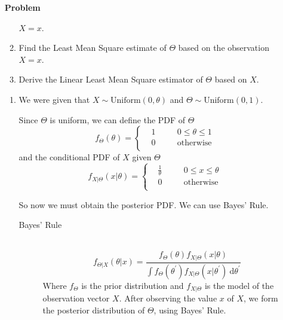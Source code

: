 \documentclass[12pt]{article}
\newenvironment{Ex}{\textbf{Problem}\vspace{.75em}\\}{}
\newcommand{\dd}[1]{\:\mathrm{d}{#1}}
\begin{document}
\begin{enumerate}
\begin{Ex}
\begin{enumerate}
      $X = x$.
    \item Find the Least Mean Square estimate of $\Theta$ based on the
      observation $X = x$.
    \item Derive the Linear Least Mean Square estimator of $\Theta$
      based on $X$.
    \end{enumerate}
    \begin{solution} \hfill
      \begin{enumerate}
      \item We were given that $X\sim\text{Uniform}(0,\theta)$ and
        $\Theta\sim\text{Uniform}(0,1)$.

        Since $\Theta$ is uniform, we can define the PDF of $\Theta$
        \begin{equation}
          \label{eq:4a-pdf-theta}
          f_\Theta(\theta)=\left\{
            \begin{aligned}
              & 1 &&\quad 0\le\theta\le1 \\
              & 0 &&\quad \text{otherwise} \\
            \end{aligned}\right.
        \end{equation}
        and the conditional PDF of $X$ given $\Theta$
        \begin{equation}
          \label{eq:4a-pdf-x-given-theta}
          f_{X|\Theta}(x|\theta)=\left\{
            \begin{aligned}
              & \frac{1}{\theta} &&\quad 0\le x \le\theta \\
              & 0 &&\quad \text{otherwise} \\
            \end{aligned}\right.
        \end{equation}

        So now we must obtain the posterior PDF. We can use Bayes'
        Rule.

        \begin{mdframed}[backgroundcolor=silver]
          \begin{description}
          \item[Bayes' Rule] \hfill \\
            $$f_{\Theta|X}(\theta|x) =
            \frac{f_{\Theta}(\theta)f_{X|\Theta}(x|\theta)} {\int
              f_{\Theta}(\theta^{\prime})f_{X|\Theta}(x|\theta^{\prime})
              \dd{\theta^{\prime}}}$$
            Where $f_{\Theta}$ is the prior distribution and
            $f_{X|\Theta}$ is the model of the observation vector
            $X$. After observing the value $x$ of $X$, we form the
            posterior distribution of $\Theta$, using Bayes' Rule.
          \end{description}
        \end{mdframed}


\end{enumerate}
\end{solution}
\end{Ex}
\end{enumerate}
\end{document}
